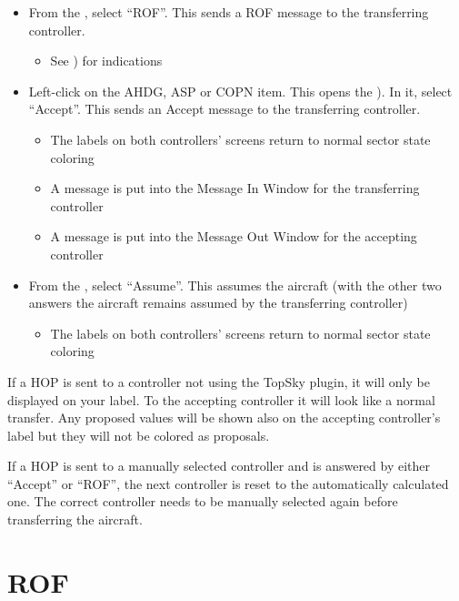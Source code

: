 \documentclass[11pt,a4paper]{memoir}
\newenvironment{Note}
  {\begin{shaded}\marginnote{\fbox{Note}}}
  {\end{shaded}}
\begin{document}
\begin{itemize}
  \item From the \textit{}, select “ROF”. This sends a ROF message to the transferring controller.
  \begin{itemize}
    \item See \textit{}) for indications
  \end{itemize}
  \item Left-click on the AHDG, ASP or COPN item. This opens the \textit{}). In it, select “Accept”. This sends an Accept message to the transferring controller.
  \begin{itemize}
    \item The labels on both controllers’ screens return to normal sector state coloring
    \item A message is put into the Message In Window for the transferring controller
    \item A message is put into the Message Out Window for the accepting controller
  \end{itemize}
  \item From the \textit{}, select “Assume”. This assumes the aircraft (with the other two answers the aircraft remains assumed by the transferring controller)
  \begin{itemize}
    \item The labels on both controllers’ screens return to normal sector state coloring
  \end{itemize}
\end{itemize}

\begin{Note}
  If a HOP is sent to a controller not using the TopSky plugin, it will only be displayed on your label. To the accepting controller it will look like a normal transfer. Any proposed values will be shown also on the accepting controller’s label but they will not be colored as proposals.

  If a HOP is sent to a manually selected controller and is answered by either “Accept” or “ROF”, the next controller is reset to the automatically calculated one. The correct controller needs to be manually selected again before transferring the aircraft.
\end{Note}

\section{ROF}
\end{document}
